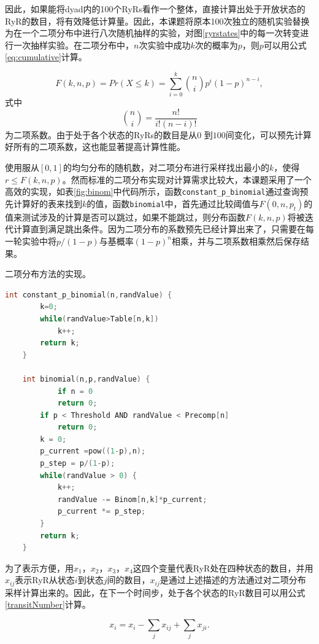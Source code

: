 因此，如果能将dyad内的100个RyRs看作一个整体，直接计算出处于开放状态的RyR的数目，将有效降低计算量。因此，本课题将原本100次独立的随机实验替换为在一个二项分布中进行八次随机抽样的实验，对图\ref{ryrstates}中的每一次转变进行一次抽样实验。在二项分布中，$n$次实验中成功$k$次的概率为$p$，则$p$可以用公式\ref{eq:cumulative}计算。

\begin{equation}
F(k,n,p)=Pr({X}\leq{k})=\sum_{i=0}^{k}\binom{n}{i}p^i(1-p)^{n-i},
\label{eq:cumulative}
\end{equation}
式中$$\binom{n}{i}=\frac{n!}{i!(n-i)!}$$为二项系数。由于处于各个状态的RyRs的数目是从$0$ 到$100$间变化，可以预先计算好所有的二项系数，这也能显著提高计算性能。

使用服从$[0,1]$的均匀分布的随机数，对二项分布进行采样找出最小的$k$，使得$r \leq F(k,n,p)$。然而标准的二项分布实现对计算需求比较大，本课题采用了一个高效的实现，如表\ref{fig:binom}中代码所示，函数{\tt constant\_p\_binomial}通过查询预先计算好的表来找到$k$的值，函数{\tt binomial}中，首先通过比较阈值与$F(0,n,p_t)$的值来测试涉及的计算是否可以跳过，如果不能跳过，则分布函数$F(k,n,p)$将被迭代计算直到满足跳出条件。因为二项分布的系数预先已经计算出来了，只需要在每一轮实验中将$p/(1-p)$与基概率$(1-p)^n$相乘，并与二项系数相乘然后保存结果。

 \begin{table}
\caption{二项分布方法的实现。}
\label{fig:binom}
\begin{lstlisting}[language=C++, basicstyle=\ttfamily\footnotesize]
    int constant_p_binomial(n,randValue) {
        k=0;
        while(randValue>Table[n,k]) 
            k++;
        return k;
    }

    int binomial(n,p,randValue) {
        	if n = 0
		    return 0;
        if p < Threshold AND randValue < Precomp[n]
            return 0;
        k = 0;
        p_current =pow((1-p),n);
        p_step = p/(1-p);
        while(randValue > 0) {
            k++;
            randValue -= Binom[n,k]*p_current;
            p_current *= p_step;
        }
        return k;
    }  
           \end{lstlisting}
\end{table}

为了表示方便，用$x_1$，$x_2$，$x_3$，$x_4$这四个变量代表RyR处在四种状态的数目，并用$x_{ij}$表示RyR从状态$i$到状态$j$间的数目，$x_{ij}$是通过上述描述的方法通过对二项分布采样计算出来的。因此，在下一个时间步，处于各个状态的RyR数目可以用公式\ref{transitNumber}计算。

\begin{equation}
\label{transitNumber}
x_i = x_i - \sum_{j}x_{ij}+\sum_{j}x_{ji}.
\end{equation}

